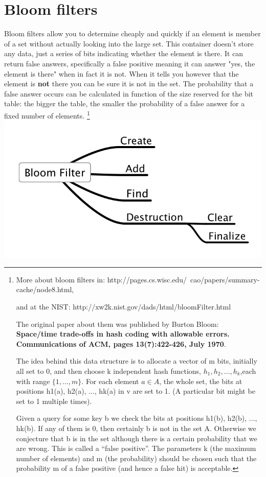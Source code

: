 \documentclass[12pt,a4paper]{memoir} %
\newcommand{\container}{}
\begin{document}
{{\section{Bloom filters}
\renewcommand{\container}{BloomFilter}
Bloom filters allow you to determine cheaply and quickly if an element is member of a set without actually looking into the large set. This container
doesn't store any data, just a series of bits indicating whether the element is there. 
It can return false answers, specifically a false positive meaning
it can answer "yes, the element is there" when in fact it is not. When it tells you however that the element is \textbf{not} there you can be sure
it is not in the set. The probability that a false answer occurs can be calculated in function of the size reserved for the bit table: the bigger
the table, the smaller the probability of a false answer for a fixed number of elements. \footnote{More about bloom filters in:
http://pages.cs.wisc.edu/~cao/papers/summary-cache/node8.html,\par\noindent and at the NIST: http://xw2k.nist.gov/dads/html/bloomFilter.html\par 
The original paper about them was published by Burton Bloom: \textbf{Space/time trade-offs in hash coding with allowable errors.
Communications of ACM, pages 13(7):422-426, July 1970}.\par 
The idea behind this data structure is to allocate a vector of m bits, initially all set to 0, and then choose k independent hash functions, $h_1, h_2, 
\ldots, h_k$,each with range $\{1,\ldots,m\}$. For each element $a \in A$, the whole set, the bits at positions h1(a), h2(a), ..., hk(a) in v are set 
to 1. (A particular bit might be set to 1 multiple times). 

Given a query for some key b we check the bits at positions h1(b), h2(b), ..., hk(b). If any of them is 0, then certainly b is not in the set A. 
Otherwise we conjecture that b is in the set although there is a certain probability that we are wrong. This is called a ``false positive''. The 
parameters k (the maximum number of elements) and m (the probability) should be chosen such that the probability m of a false positive (and hence a 
false hit) is acceptable.
}
\includegraphics[scale=0.45]{BloomFilter.png}\par
}}
\end{document}
